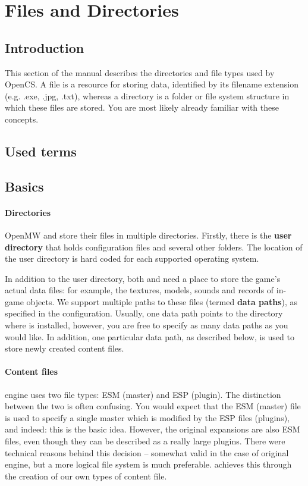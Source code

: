 \section{Files and Directories}
\subsection{Introduction}
This section of the manual describes the directories and file types used by OpenCS. A file is a resource for storing data, identified by its
filename extension (e.g. .exe, .jpg, .txt), whereas a directory is a folder or file system structure in which these files are stored. You
are most likely already familiar with these concepts.

\subsection{Used terms} %

\subsection{Basics}

\paragraph{Directories}
OpenMW and \OCS{} store their files in multiple directories. Firstly, there is the \textbf{user directory} that holds configuration
files and several other folders. The location of the user directory is hard coded for each supported operating system.

In addition to the user directory, both \OMW{} and \OCS{} need a place to store the game’s actual data files: for example, the
textures, models, sounds and records of in-game objects. We support multiple paths to these files (termed \textbf{data paths}),
as specified in the configuration. Usually, one data path points to the directory where \MW{} is installed, however, you are
free to specify as many data paths as you would like. In addition, one particular data path, as described below, is used to store
newly created content files.

\paragraph{Content files}
\BS{} \MW{} engine uses two file types: ESM (master) and ESP (plugin). The distinction between the two is often confusing.
You would expect that the ESM (master) file is used to specify a single master which is modified by the ESP files (plugins), and indeed:
this is the basic idea. However, the original expansions are also ESM files, even though they can be described as a really large plugins.
There were technical reasons behind this decision -- somewhat valid in the case of original engine, but a more logical file system is
much preferable. \OMW{} achieves this through the creation of our own types of content file.

